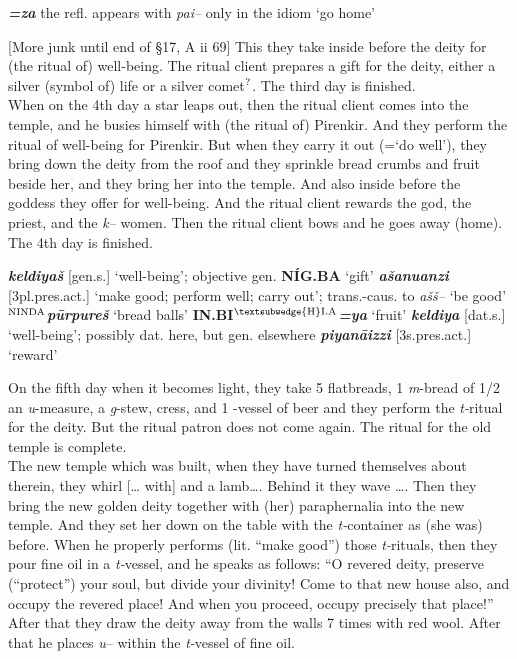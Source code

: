 \documentclass[10pt]{article}
\newcommand{\supersc}[1]{$^{\textrm{\scriptsize{#1}}}$}  	%
\newcommand{\bit}[1]{\textbf{\textit{#1}}}				%
\newcommand{\p}[1]{{\tiny[{#1}]}}					%
\newcommand{\hith}{\textsubwedge{h}}
\newcommand{\Hith}{\textsubwedge{H}}
\newcommand{\hpl}{\supersc{{\Hith}I.A}}
\newcommand{\bread}{\supersc{NINDA}}
\renewcommand{\.}[1]{\textsubdot{#1}}
\begin{document}
\begin{description}
\begin{notes}

\bit{=za} the refl. appears with \textit{pai--} only in the idiom `go home'

\end{notes}

\item[\S\S17--19 :] {[}More junk until end of \S17, A ii 69] This they take inside before the deity for (the ritual of) well-being. The ritual client prepares a gift for the deity, either a silver (symbol of) life or a silver comet\supersc{?}. The third day is finished. \\

When on the 4th day a star leaps out, then the ritual client comes into the temple, and he busies himself with (the ritual of) Pirenkir. And they perform the ritual of well-being for Pirenkir. But when they carry it out (=`do well'), they bring down the deity from the roof and they sprinkle bread crumbs and fruit beside her, and they bring her into the temple. And also inside before the goddess they offer for well-being. And the ritual client rewards the god, the priest, and the \textit{k--} women. Then the ritual client bows and he goes away (home). The 4th day is finished. 


\begin{notes}

\bit{keldiya\v{s}} \p{gen.s.} `well-being'; objective gen. \textbf{N\'IG.BA} `gift' \bit{a\v{s}anuanzi} \p{3pl.pres.act.} `make good; perform well; carry out'; trans.-caus. to \textit{a\v{s}\v{s}--} `be good' \textbf{\bread}\bit{p\=urpure\v{s}} `bread balls' \textbf{IN.BI{\hpl}}\bit{=ya} `fruit' \bit{keldiya} \p{dat.s.} `well-being'; possibly dat. here, but gen. elsewhere \bit{piyan\=aizzi} \p{3s.pres.act.} `reward'

\end{notes}

\item[\S\S20--22 :] On the fifth day when it becomes light, they take 5 flatbreads, 1 \textit{m}-bread of 1/2 an \textit{u}-measure, a \textit{g}-stew, cress, and 1 \textit{\hith}-vessel of beer and they perform the \textit{t-}ritual for the deity. But the ritual patron does not come again. The ritual for the old temple is complete. \\

The new temple which was built, when they have turned themselves about therein, they whirl [{\ldots} with] and a lamb{\ldots}. Behind it they wave {\ldots}. Then they bring the new golden deity together with (her) paraphernalia into the new temple. And they set her down on the table with the \textit{t-}container as (she was) before. When he properly performs (lit. ``make good'') those \textit{t-}rituals, then they pour fine oil in a \textit{t-}vessel, and he speaks as follows: ``O revered deity, preserve (``protect'') your soul, but divide your divinity! Come to that new house also, and occupy the revered place! And when you proceed, occupy precisely that place!'' After that they draw the deity away from the walls 7 times with red wool. After that he places \textit{u}-- within the \textit{t-}vessel of fine oil.



\end{description}
\end{document}
